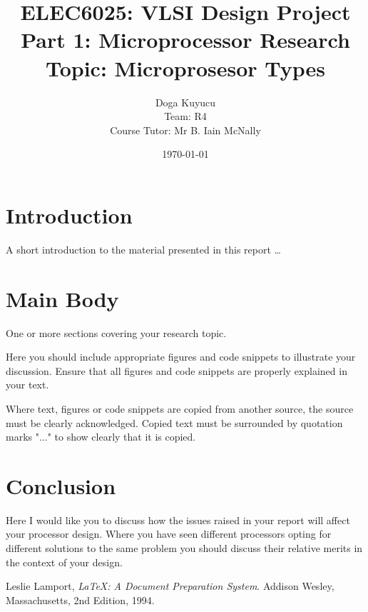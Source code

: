 \documentclass[12pt,a4paper]{article}
\title{ELEC6025: VLSI Design Project \\Part 1: Microprocessor Research\\Topic: Microprosesor Types}
\author{Doga Kuyucu\\ Team: R4\\Course Tutor: Mr B. Iain McNally}
\date{\today}
\begin{document}
\begin{titlepage}
\maketitle
\end{titlepage}

\tableofcontents
\clearpage

\section{Introduction}
A short introduction to the material presented in this report \dots\citep{greenwade93}

\section{Main Body}
One or more sections covering your research topic.

Here you should include appropriate figures and code snippets to illustrate your discussion. Ensure that all figures and code snippets are properly explained in your text.

Where text, figures or code snippets are copied from another source, the source must be clearly acknowledged. Copied text must be surrounded by quotation marks "..." to show clearly that it is copied. 

\section{Conclusion}
Here I would like you to discuss how the issues raised in your report will affect your processor design. Where you have seen different processors opting for different solutions to the same problem you should discuss their relative merits in the context of your design. 



\renewcommand{\refname}{Bibliography}
\begin{thebibliography}{9}

  Leslie Lamport,
  \emph{\LaTeX: A Document Preparation System}.
  Addison Wesley, Massachusetts,
  2nd Edition,
  1994.

\end{thebibliography}
\end{document}
